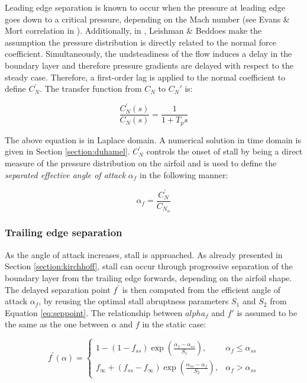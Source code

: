 Leading edge separation is known to occur when the pressure at leading edge goes down to a critical pressure, depending on the Mach number (see Evans \& Mort correlation in \cite{sheng_new_2006}). Additionally, in \cite{leishman_semi-empirical_1989}, Leishman \& Beddoes make the assumption the pressure distribution is directly related to the normal force coefficient. Simultaneously, the undsteadiness of the flow induces a delay in the boundary layer and therefore pressure gradients are delayed with respect to the steady case. Therefore, a first-order lag is applied to the normal coefficient to define $C_N^{\prime}$. The transfer function from $C_N$ to $C_N'$ is: 

\begin{equation}
\frac{C_N^{\prime}(s)}{C_N(s)} = \frac{1}{1+T_p s}
\label{eq:cnprime_laplace}  
\end{equation}

The above equation is in Laplace domain. A numerical solution in time domain is given in Section \ref{section:duhamel}. $C_N^{\prime}$ controls the onset of stall by being a direct measure of the pressure distribution on the airfoil and is used to define the \textit{separated effective angle of attack} $\alpha_f$ in the following manner:

\begin{equation}
\alpha_f = \frac{C_N^{\prime}}{C_{N_\alpha}}
\label{eq:separated_effective_alpha}
\end{equation}

\subsubsection{Trailing edge separation}

As the angle of attack increases, stall is approached. As already presented in Section \ref{section:kirchhoff}, stall can occur through progressive separation of the boundary layer from the trailing edge forwards, depending on the airfoil shape. The delayed separation point $f^{\prime}$ is then computed from the efficient angle of attack $\alpha_f$, by reusing the optimal stall abruptness parameters $S_1$ and $S_2$ from Equation \eqref{eq:seppoint}.  The relationship between $alpha_f$ and $f'$ is assumed to be the same as the one between $\alpha$ and $f$ in the static case:

\begin{equation}
f^{\prime}(\alpha)=\left\{\begin{array}{ll}
1-(1-f_{ss}) \exp \left(\frac{\alpha_{f}-\alpha_{ss}}{S_{1}}\right), & \alpha_{f} \leq \alpha_{ss} \\
f_\infty + (f_{ss}-f_\infty) \exp \left(\frac{\alpha_{ss}-\alpha_{f}}{S_{2}}\right), & \alpha_{f}>\alpha_{ss}
\end{array}\right.
\end{equation}

